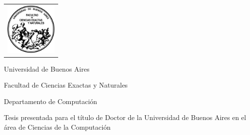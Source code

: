 \newcommand{\HRule}{\rule{\linewidth}{0.2mm}}
%
\thispagestyle{empty}

\begin{center}\leavevmode

    \vspace{-2cm}

    \begin{tabular}{l}
        \includegraphics[width=2.6cm]{img/logofcen.png}
    \end{tabular}


    {\large \sc Universidad de Buenos Aires

    Facultad de Ciencias Exactas y Naturales

    Departamento de Computaci\'on}

    \vspace{6.0cm}


    \begin{huge}
        \textbf{\tituloTesis}
    \end{huge}

    \vspace{2cm}

    {\large Tesis presentada para el título de Doctor de la Universidad de Buenos Aires en
        el área de Ciencias de la Computaci\'on}

    \vspace{2cm}

    {\Large \autor}

\end{center}

\vfill


